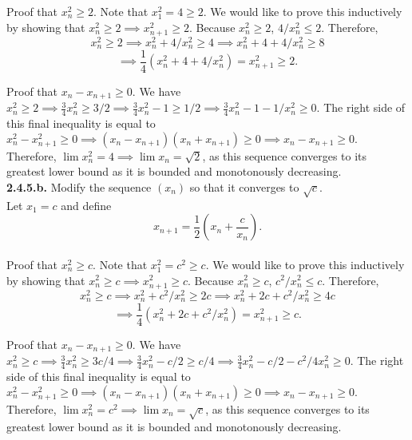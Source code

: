 \documentclass[12pt,letterpaper]{article}
\begin{document}
Proof that \(x_{n}^{2}\geq 2\). Note that \(x_{1}^{2} = 4 \geq 2\). We would like to prove this inductively by showing that \(x_{n}^{2} \geq 2 \implies x_{n+1}^{2} \geq 2\). Because \(x_{n}^{2} \geq 2\), \(4/x_{n}^{2} \leq 2\). Therefore, \[x_{n}^{2} \geq 2 \implies x_{n}^{2} + 4/x_{n}^{2} \geq 4 \implies x_{n}^{2} + 4 + 4/x_{n}^{2} \geq 8 \] \[\implies \frac{1}{4}\left(x_{n}^{2} + 4 + 4/x_{n}^{2}\right) = x_{n+1}^{2} \geq 2.\] 

Proof that \(x_{n} - x_{n+1} \geq 0\). We have \(x_{n}^{2} \geq 2 \implies \frac{3}{4}x_{n}^{2} \geq 3/2 \implies \frac{3}{4}x_{n}^{2} - 1 \geq 1/2 \implies \frac{3}{4}x_{n}^{2} - 1 - 1/x_{n}^{2} \geq 0\). The right side of this final inequality is equal to \(x_{n}^{2} - x_{n+1}^{2} \geq 0 \implies (x_{n}-x_{n+1})(x_{n}+x_{n+1}) \geq 0 \implies x_{n}-x_{n+1} \geq 0.\) \\

Therefore, \(\lim x_{n}^{2} = 4 \implies \lim x_{n} = \sqrt{2}\), as this sequence converges to its greatest lower bound as it is bounded and monotonously decreasing.\\

\textbf{2.4.5.b.} Modify the sequence \((x_{n})\) so that it converges to \(\sqrt{c}\). \\

Let \(x_{1} = c\) and define \[x_{n+1} = \frac{1}{2}\left(x_{n}  + \frac{c}{x_{n}}\right).\] \\

Proof that \(x_{n}^{2}\geq c\). Note that \(x_{1}^{2} = c^{2} \geq c\). We would like to prove this inductively by showing that \(x_{n}^{2} \geq c \implies x_{n+1}^{2} \geq c\). Because \(x_{n}^{2} \geq c\), \(c^{2}/x_{n}^{2} \leq c\). Therefore, \[x_{n}^{2} \geq c \implies x_{n}^{2} + c^{2}/x_{n}^{2} \geq 2c \implies x_{n}^{2} + 2c + c^{2}/x_{n}^{2} \geq 4c \] \[\implies \frac{1}{4}\left(x_{n}^{2} + 2c + c^{2}/x_{n}^{2}\right) = x_{n+1}^{2} \geq c.\] 

Proof that \(x_{n} - x_{n+1} \geq 0\). We have \(x_{n}^{2} \geq c \implies \frac{3}{4}x_{n}^{2} \geq 3c/4 \implies \frac{3}{4}x_{n}^{2} - c/2 \geq c/4 \implies \frac{3}{4}x_{n}^{2} - c/2 - c^{2}/4x_{n}^{2} \geq 0\). The right side of this final inequality is equal to \(x_{n}^{2} - x_{n+1}^{2} \geq 0 \implies (x_{n}-x_{n+1})(x_{n}+x_{n+1}) \geq 0 \implies x_{n}-x_{n+1} \geq 0.\) \\

Therefore, \(\lim x_{n}^{2} = c^{2} \implies \lim x_{n} = \sqrt{c}\), as this sequence converges to its greatest lower bound as it is bounded and monotonously decreasing. \\
\end{document}
